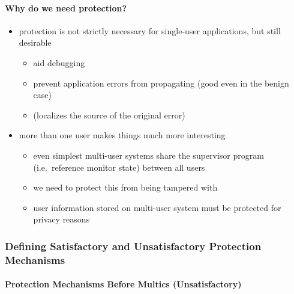 \documentclass[
  12pt]{findlay}
\providecommand{\tightlist}{%
  \setlength{\itemsep}{0pt}\setlength{\parskip}{0pt}}
\begin{document}
\hypertarget{why-do-we-need-protection}{%
\paragraph{Why do we need protection?}\label{why-do-we-need-protection}}

\begin{itemize}
\tightlist
\item
  protection is not strictly necessary for single-user applications, but
  still desirable

  \begin{itemize}
  \tightlist
  \item
    aid debugging
  \item
    prevent application errors from propagating (good even in the benign
    case)
  \item
    (localizes the source of the original error)
  \end{itemize}
\item
  more than one user makes things much more interesting

  \begin{itemize}
  \tightlist
  \item
    even simplest multi-user systems share the supervisor program
    (i.e.~reference monitor state) between all users
  \item
    we need to protect this from being tampered with
  \item
    user information stored on multi-user system must be protected for
    privacy reasons
  \end{itemize}
\end{itemize}

\hypertarget{defining-satisfactory-and-unsatisfactory-protection-mechanisms}{%
\subsubsection{Defining Satisfactory and Unsatisfactory Protection
Mechanisms}\label{defining-satisfactory-and-unsatisfactory-protection-mechanisms}}

\hypertarget{protection-mechanisms-before-multics-unsatisfactory}{%
\paragraph{Protection Mechanisms Before Multics
(Unsatisfactory)}\label{protection-mechanisms-before-multics-unsatisfactory}}
\end{document}

